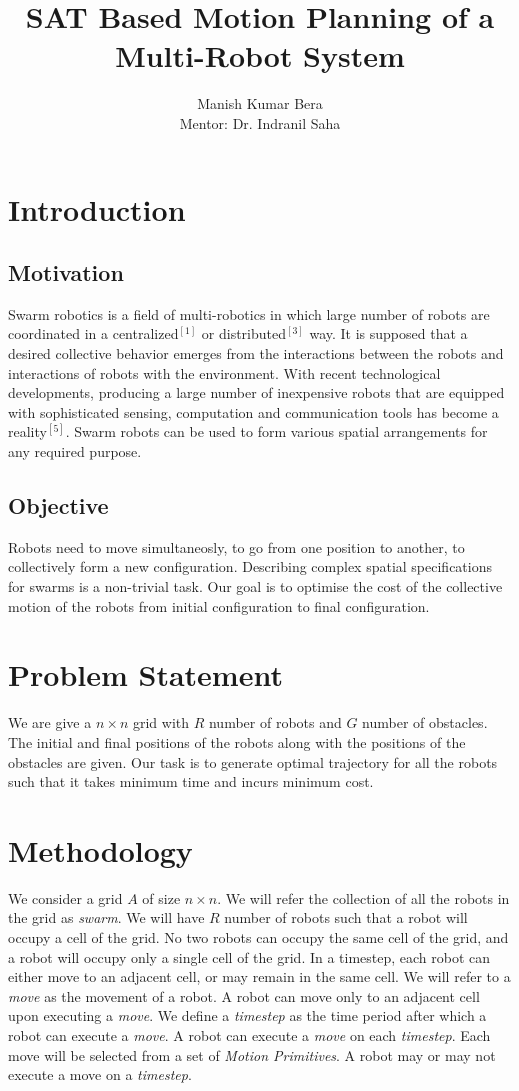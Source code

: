 \documentclass{article}[11pt]
\title{SAT Based Motion Planning of a Multi-Robot System}
\author{Manish Kumar Bera \\
Mentor: Dr. Indranil Saha
}
\begin{document}
	\maketitle

	\section{Introduction}
		\subsection{Motivation}
		Swarm robotics is a field of multi-robotics in which large number of robots are coordinated in a centralized$^{[1]}$ or distributed$^{[3]}$ way.
		It is supposed that a desired collective behavior emerges from the interactions between the robots and interactions of robots with the environment.
		With  recent  technological  developments, producing a large number of inexpensive robots that are  equipped  with  sophisticated  sensing,  computation and communication tools has become a reality$^{[5]}$. 
		Swarm robots can be used to form various spatial arrangements for any required purpose.
		\subsection{Objective}
		Robots need to move simultaneosly, to go from one position to another, to collectively form a new configuration.
		Describing complex spatial specifications for swarms is a non-trivial task. Our goal is
		to optimise the cost of the collective motion of the robots from initial configuration
		to final configuration.




	\section{Problem Statement}
		We are give a $n \times n$ grid with $R$ number of robots and $G$ number of obstacles. The initial and final positions of the robots along with the positions of the obstacles are given. Our task is to generate optimal trajectory for all the robots such that it takes minimum time and incurs minimum cost. 
	\section{Methodology}
		We consider a grid $A$ of size $n \times n$.
		We will refer the collection of all the robots in the grid as \textit{swarm}. 
		We will have $R$ number of robots such that a robot will occupy a cell of the grid.
		No two robots can occupy the same cell of the grid, and a robot will occupy only a single cell of the grid.
		In a timestep, each robot can either move to an adjacent cell, or may remain in the same cell.
		We will refer to a \textit{move} as the movement of a robot.
		A robot can move only to an adjacent cell upon executing a \textit{move}.
		We define a \textit{timestep} as the time period after which a robot can execute a \textit{move}.
		A robot can execute a \textit{move} on each \textit{timestep}.
		Each move will be selected from a set of \textit{Motion Primitives}. 
		A robot may or may not execute a move on a \textit{timestep}.
\end{document}
